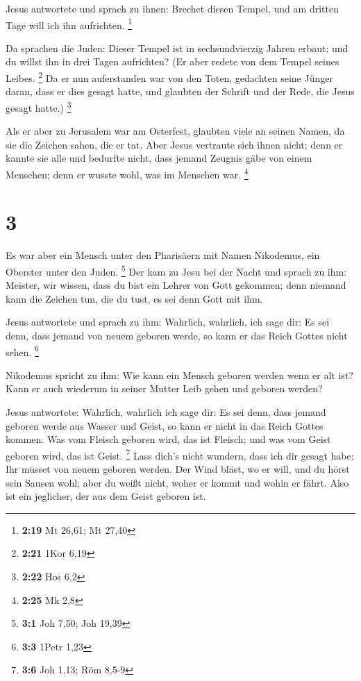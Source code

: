  Jesus antwortete und sprach zu ihnen: Brechet diesen
Tempel, und am dritten Tage will ich ihn aufrichten. \footnote{\textbf{2:19}
  Mt 26,61; Mt 27,40}

 Da sprachen die Juden: Dieser Tempel ist in
sechsundvierzig Jahren erbaut; und du willst ihn in drei Tagen
aufrichten?  (Er aber redete von dem Tempel seines
Leibes. \footnote{\textbf{2:21} 1Kor 6,19}  Da er nun
auferstanden war von den Toten, gedachten seine Jünger daran, dass er
dies gesagt hatte, und glaubten der Schrift und der Rede, die Jesus
gesagt hatte.) \footnote{\textbf{2:22} Hos 6,2}

 Als er aber zu Jerusalem war am Osterfest, glaubten
viele an seinen Namen, da sie die Zeichen sahen, die er tat.
 Aber Jesus vertraute sich ihnen nicht; denn er kannte
sie alle  und bedurfte nicht, dass jemand Zeugnis gäbe
von einem Menschen; denn er wusste wohl, was im Menschen war.
\footnote{\textbf{2:25} Mk 2,8}

\hypertarget{section-2}{%
\section{3}\label{section-2}}

 Es war aber ein Mensch unter den Pharisäern mit Namen
Nikodemus, ein Oberster unter den Juden. \footnote{\textbf{3:1} Joh
  7,50; Joh 19,39}  Der kam zu Jesu bei der Nacht und
sprach zu ihm: Meister, wir wissen, dass du bist ein Lehrer von Gott
gekommen; denn niemand kann die Zeichen tun, die du tust, es sei denn
Gott mit ihm.

 Jesus antwortete und sprach zu ihm: Wahrlich, wahrlich,
ich sage dir: Es sei denn, dass jemand von neuem geboren werde, so kann
er das Reich Gottes nicht sehen. \footnote{\textbf{3:3} 1Petr 1,23}

 Nikodemus spricht zu ihm: Wie kann ein Mensch geboren
werden wenn er alt ist? Kann er auch wiederum in seiner Mutter Leib
gehen und geboren werden?

 Jesus antwortete: Wahrlich, wahrlich ich sage dir: Es sei
denn, dass jemand geboren werde aus Wasser und Geist, so kann er nicht
in das Reich Gottes kommen.  Was vom Fleisch geboren wird,
das ist Fleisch; und was vom Geist geboren wird, das ist Geist.
\footnote{\textbf{3:6} Joh 1,13; Röm 8,5-9}  Lass dich's
nicht wundern, dass ich dir gesagt habe: Ihr müsset von neuem geboren
werden.  Der Wind bläst, wo er will, und du hörst sein
Sausen wohl; aber du weißt nicht, woher er kommt und wohin er fährt.
Also ist ein jeglicher, der aus dem Geist geboren ist.

